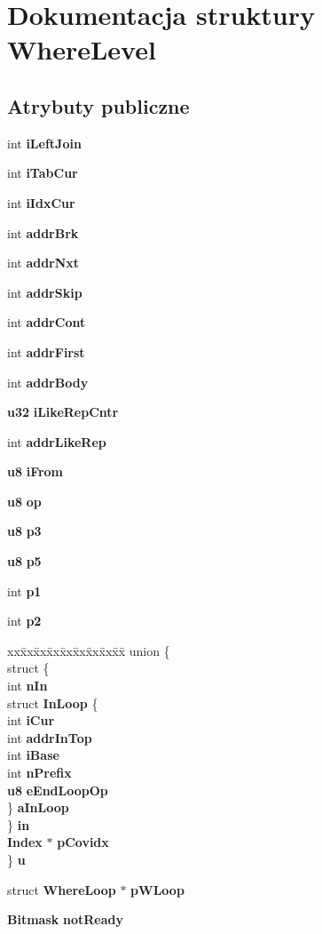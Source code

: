 \section{Dokumentacja struktury Where\+Level}
\label{struct_where_level}
\subsection*{Atrybuty publiczne}
\begin{DoxyCompactItemize}
\item 
int \textbf{ i\+Left\+Join}
\item 
int \textbf{ i\+Tab\+Cur}
\item 
int \textbf{ i\+Idx\+Cur}
\item 
int \textbf{ addr\+Brk}
\item 
int \textbf{ addr\+Nxt}
\item 
int \textbf{ addr\+Skip}
\item 
int \textbf{ addr\+Cont}
\item 
int \textbf{ addr\+First}
\item 
int \textbf{ addr\+Body}
\item 
\textbf{ u32} \textbf{ i\+Like\+Rep\+Cntr}
\item 
int \textbf{ addr\+Like\+Rep}
\item 
\textbf{ u8} \textbf{ i\+From}
\item 
\textbf{ u8} \textbf{ op}
\item 
\textbf{ u8} \textbf{ p3}
\item 
\textbf{ u8} \textbf{ p5}
\item 
int \textbf{ p1}
\item 
int \textbf{ p2}
\item 
\begin{tabbing}
xx\=xx\=xx\=xx\=xx\=xx\=xx\=xx\=xx\=\kill
union \{\\
\>struct \{\\
\>\>int \textbf{ nIn}\\
\>\>struct {\bfseries InLoop} \{\\
\>\>\>int \textbf{ iCur}\\
\>\>\>int \textbf{ addrInTop}\\
\>\>\>int \textbf{ iBase}\\
\>\>\>int \textbf{ nPrefix}\\
\>\>\>\textbf{ u8} \textbf{ eEndLoopOp}\\
\>\>\} \textbf{ aInLoop}\\
\>\} \textbf{ in}\\
\>\textbf{ Index} $\ast$ \textbf{ pCovidx}\\
\} \textbf{ u}\\

\end{tabbing}\item 
struct \textbf{ Where\+Loop} $\ast$ \textbf{ p\+W\+Loop}
\item 
\textbf{ Bitmask} \textbf{ not\+Ready}
\end{DoxyCompactItemize}


